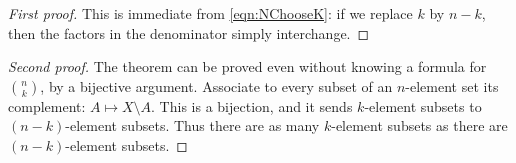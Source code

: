 

\setcounter{section}{3}
\setcounter{subsection}{1}
\setcounter{dfn}{1}

\begin{proof}[First proof]
This is immediate from \eqref{eqn:NChooseK}: if we replace $k$ by $n-k$, then the factors in the denominator simply interchange.
\end{proof}
\begin{proof}[Second proof]
The theorem can be proved even without knowing a formula for $\binom{n}{k}$, by a bijective argument.
Associate to every subset of an $n$-element set its complement: $A \mapsto X \setminus A$.
This is a bijection, and it sends $k$-element subsets to $(n-k)$-element subsets.
Thus there are as many $k$-element subsets as there are $(n-k)$-element subsets.
\end{proof}


